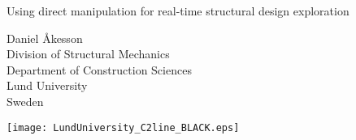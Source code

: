 \documentclass[twoside,openright,11pt]{book}
\begin{document}



\frontmatter

\begin{titlepage}
  \center
  \null
  \vspace{6cm}
  
  {\Huge Using direct manipulation for real-time structural design exploration}

  \vspace{2cm}
  
  \Large{Daniel Åkesson \\ Division of Structural Mechanics \\ Department of Construction Sciences \\ Lund University \\ Sweden}
  \vspace{1cm}
  
  \texttt{[image: LundUniversity\_C2line\_BLACK.eps]}
\end{titlepage} 


\pagestyle{plain}

 
\newpage

 
\clearpage %

\cleardoublepage

\cleardoublepage %


\cleardoublepage %


\cleardoublepage %

\tableofcontents
\end{document}
